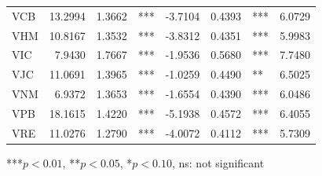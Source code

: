 \begin{table}[h]
\begin{tabular}{lrrlrrl r}
VCB & 13.2994 & 1.3662 & *** & -3.7104 & 0.4393 & *** & 6.0729 \\
VHM & 10.8167 & 1.3532 & *** & -3.8312 & 0.4351 & *** & 5.9983 \\
VIC & 7.9430 & 1.7667 & *** & -1.9536 & 0.5680 & *** & 7.7480 \\
VJC & 11.0691 & 1.3965 & *** & -1.0259 & 0.4490 & ** & 6.5025 \\
VNM & 6.9372 & 1.3653 & *** & -1.6554 & 0.4390 & *** & 6.0486 \\
VPB & 18.1615 & 1.4220 & *** & -5.1938 & 0.4572 & *** & 6.4055 \\
VRE & 11.0276 & 1.2790 & *** & -4.0072 & 0.4112 & *** & 5.7309 \\
\bottomrule\end{tabular}
\footnotesize{***$p<0.01$, **$p<0.05$, *$p<0.10$, ns: not significant}
\end{table}
